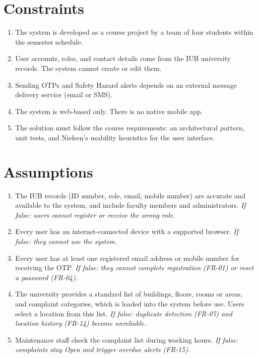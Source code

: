 \section{Constraints}
\begin{enumerate}
  \item The system is developed as a course project by a team of four students within the semester schedule.
  \item User accounts, roles, and contact details come from the IUB university records. The system cannot create or edit them.
  \item Sending OTPs and Safety Hazard alerts depends on an external message delivery service (email or SMS).
  \item The system is web-based only. There is no native mobile app.
  \item The solution must follow the course requirements: an architectural pattern, unit tests, and Nielsen's usability heuristics for the user interface.
\end{enumerate}

\section{Assumptions}
\begin{enumerate}
  \item The IUB records (ID number, role, email, mobile number) are accurate and available to the system, and include faculty members and administrators. \textit{If false: users cannot register or receive the wrong role.}
  \item Every user has an internet-connected device with a supported browser. \textit{If false: they cannot use the system.}
  \item Every user has at least one registered email address or mobile number for receiving the OTP. \textit{If false: they cannot complete registration (FR-01) or reset a password (FR-04).}
  \item The university provides a standard list of buildings, floors, rooms or areas, and complaint categories, which is loaded into the system before use. Users select a location from this list. \textit{If false: duplicate detection (FR-07) and location history (FR-14) become unreliable.}
  \item Maintenance staff check the complaint list during working hours. \textit{If false: complaints stay Open and trigger overdue alerts (FR-15).}
\end{enumerate}

